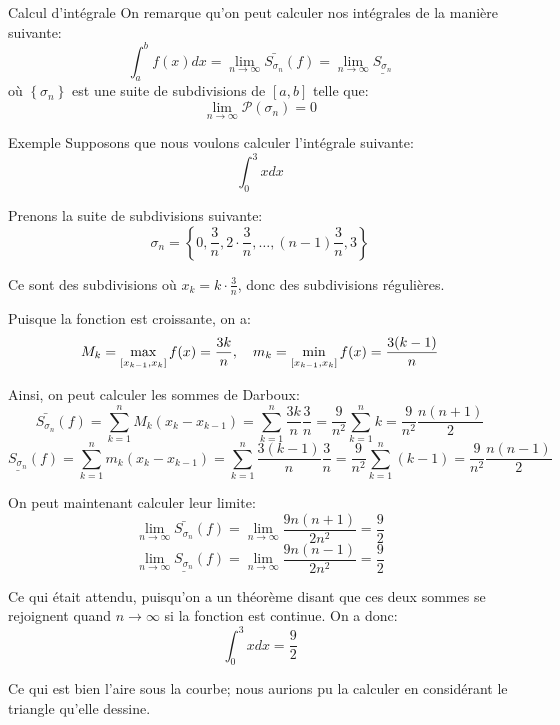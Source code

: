 \documentclass[a4paper]{article}
\begin{document}
\begin{parag}{Calcul d'intégrale}
    On remarque qu'on peut calculer nos intégrales de la manière suivante: 
    \[\int_{a}^{b} f\left(x\right)dx = \lim_{n \to \infty} \bar{S_{\sigma_n}}\left(f\right) = \lim_{n \to \infty} \underline{S_{\sigma_n}}\]
    où $\left\{\sigma_n\right\}$ est une suite de subdivisions de $\left[a, b\right]$ telle que:
    \[\lim_{n \to \infty} \mathcal{P}\left(\sigma_n\right) = 0\]
\end{parag}

\begin{parag}{Exemple}
    Supposons que nous voulons calculer l'intégrale suivante: 
    \[\int_{0}^{3} xdx\]
    
    Prenons la suite de subdivisions suivante: 
    \[\sigma_n = \left\{0, \frac{3}{n}, 2\cdot \frac{3}{n}, \ldots, \left(n-1\right) \frac{3}{n}, 3\right\}\]
    
    Ce sont des subdivisions où $x_k = k \cdot \frac{3}{n}$, donc des subdivisions régulières.

    Puisque la fonction est croissante, on a: 
    \[M_k = \max_{\left[x_{k-1}, x_k\right]}f\left(x\right) = \frac{3k}{n}, \mathspace m_k = \min_{\left[x_{k-1}, x_k\right]}f\left(x\right) = \frac{3\left(k-1\right)}{n}\]
    
    Ainsi, on peut calculer les sommes de Darboux: 
    \[\bar{S_{\sigma_n}}\left(f\right) = \sum_{k=1}^{n} M_k \left(x_k - x_{k-1}\right) = \sum_{k=1}^{n} \frac{3k}{n} \frac{3}{n} = \frac{9}{n^2} \sum_{k=1}^{n} k = \frac{9}{n^2} \frac{n\left(n+1\right)}{2}\]
    \[\underline{S_{\sigma_n}}\left(f\right) = \sum_{k=1}^{n} m_k \left(x_k - x_{k-1}\right) = \sum_{k=1}^{n} \frac{3\left(k - 1\right)}{n} \frac{3}{n} = \frac{9}{n^2} \sum_{k=1}^{n} \left(k-1\right) = \frac{9}{n^2} \frac{n\left(n-1\right)}{2}\]
    
    On peut maintenant calculer leur limite:
    \[\lim_{n \to \infty} \bar{S_{\sigma_n}}\left(f\right) = \lim_{n \to \infty} \frac{9n\left(n+1\right)}{2n^2} = \frac{9}{2}\]
    \[\lim_{n \to \infty} \underline{S_{\sigma_n}}\left(f\right) = \lim_{n \to \infty} \frac{9n\left(n-1\right)}{2n^2} = \frac{9}{2}\]

    Ce qui était attendu, puisqu'on a un théorème disant que ces deux sommes se rejoignent quand $n \to \infty$ si la fonction est continue. On a donc: 
    \[\int_{0}^{3} xdx = \frac{9}{2}\]
    
    Ce qui est bien l'aire sous la courbe; nous aurions pu la calculer en considérant le triangle qu'elle dessine.
\end{parag}
\end{document}
